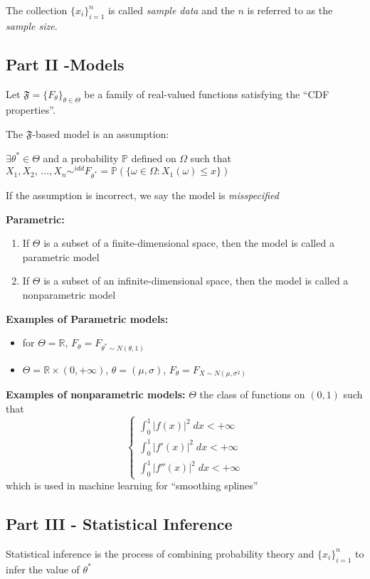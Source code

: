 \documentclass[12pt]{article}
\renewcommand{\P}{\mathbb{P}}
\newcommand{\R}{\mathbb{R}}
\begin{document}
The collection $\{x_i\}_{i=1}^n$ is called \emph{sample data} and the $n$ is referred to as the \emph{sample size}.

\subsection*{Part II -Models}
Let $\mathfrak{F} = \{F_\theta\}_{\theta \in \Theta}$ be a family of real-valued functions satisfying the ``CDF properties''.

The $\mathfrak{F}$-based model is an assumption:

$\exists \theta^* \in \Theta$ and a probability $\P$ defined on $\Omega$ such that $X_1, X_2,\, ..., X_n \sim^{idd} F_{\theta^*} = \P(\{\omega \in \Omega: X_1(\omega) \leq x\})$

If the assumption is incorrect, we say the model is \emph{misspecified}

\textbf{Parametric:}
\begin{enumerate}
    \item If $\Theta$ is a subset of a finite-dimensional space, then the model is called a parametric model
    \item If $\Theta$ is a subset of an infinite-dimensional space, then the model is called a nonparametric model
\end{enumerate}

\textbf{Examples of Parametric models:}
\begin{itemize}
    \item for $\Theta =\R$, $F_\theta = F_{\theta^* \sim N(\theta, 1)}$\\
    \item $\Theta = \R \times (0, +\infty)$, $\theta = (\mu, \sigma)$, $F_\theta = F_{X \sim N(\mu, \sigma^2)}$
\end{itemize}

\textbf{Examples of nonparametric models:}
$\Theta$ the class of functions on $(0,1)$ such that 
\[\begin{cases}
    \int_0^1 |f(x)|^2\; dx < +\infty\\
    \int_0^1 |f'(x)|^2\; dx < +\infty\\
    \int_0^1 |f''(x)|^2\; dx < +\infty
\end{cases}\]
which is used in machine learning for ``smoothing splines''

\subsection*{Part III - Statistical Inference}
Statistical inference is the process of combining probability theory and $\{x_i\}_{i=1}^n$ to infer the value of $\theta^*$
\end{document}
